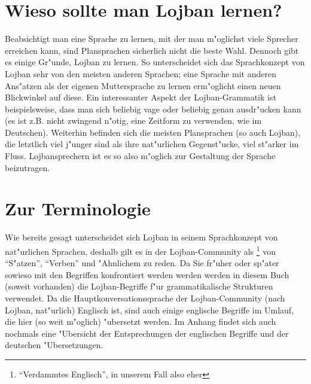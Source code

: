 \section{Wieso sollte man Lojban lernen?}
Beabsichtigt man eine Sprache zu lernen, mit der man m"oglichst viele Sprecher erreichen kann, sind Plansprachen sicherlich nicht die beste Wahl.
Dennoch gibt es einige Gr"unde, Lojban zu lernen. So unterscheidet sich das Sprachkonzept von Lojban sehr von den meisten anderen Sprachen;
eine Sprache mit anderen Ans"atzen als der eigenen Muttersprache zu lernen erm"oglicht einen neuen Blickwinkel auf diese. Ein interessanter Aspekt der Lojban-Grammatik ist beispielsweise, dass
man sich beliebig vage oder beliebig genau ausdr"ucken kann (es ist z.B. nicht zwingend n"otig, eine Zeitform zu verwenden, wie im Deutschen). Weiterhin befinden sich die meisten Plansprachen (so auch Lojban), die letztlich viel j"unger sind als ihre
nat"urlichen Gegenst"ucke, viel st"arker im Fluss. Lojbansprechern ist es so also m"oglich zur Gestaltung der Sprache beizutragen.


\section{Zur Terminologie}
Wie bereits gesagt unterscheidet sich Lojban in seinem Sprachkonzept von nat"urlichen Sprachen, deshalb gilt es in der Lojban-Community als \footnote{``Verdammtes Englisch'', in unserem Fall also eher }
von ``S"atzen'', ``Verben'' und "Ahnlichem zu reden. Da Sie fr"uher oder sp"ater sowieso mit den Begriffen konfrontiert werden werden
werden in diesem Buch (soweit vorhanden) die Lojban-Begriffe f"ur grammatikalische Strukturen verwendet. Da die Hauptkonversationssprache der Lojban-Community (nach Lojban, nat"urlich) Englisch ist, sind auch einige englische Begriffe im Umlauf, die hier (so weit m"oglich) "ubersetzt werden. Im Anhang findet sich auch nochmals eine "Ubersicht der Entsprechungen der englischen Begriffe und der deutschen "Ubersetzungen.

